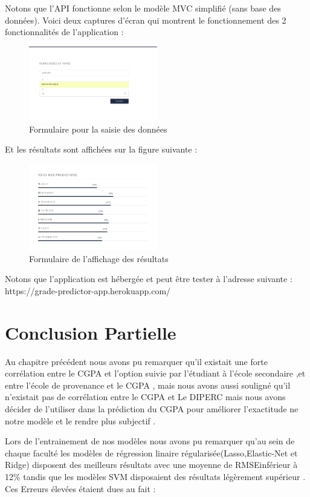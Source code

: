 Notons que l'API fonctionne selon le modèle \ac{MVC} simplifié (sans base des données).
Voici deux captures d'écran qui montrent le fonctionnement des 2 fonctionnalités de l'application :
\begin{figure}[H]
	\centering
	\includegraphics[width=0.5\textwidth]{fig/form.png}
	\caption{Formulaire pour la saisie des données }
	\label{fig:apiForm}
\end{figure}  
Et les résultats sont affichées sur la figure suivante :  
\begin{figure}[H]
	\centering
	\includegraphics[width=0.5\textwidth]{fig/results.png}
	\caption{Formulaire de l'affichage des résultats}
	\label{fig:displaydata}
\end{figure}  
Notons que l'application est hébergée et peut être tester à l'adresse suivante : https://grade-predictor-app.herokuapp.com/
  
\section{Conclusion Partielle }
Au chapitre précédent nous avons pu remarquer qu'il existait une forte corrélation entre le CGPA et l'option suivie par l'étudiant à l'école secondaire ,et entre l'école de provenance et le CGPA , mais nous avons aussi souligné qu'il n'existait pas de corrélation entre le CGPA et Le DIPERC mais nous avons décider de l'utiliser dans la prédiction du CGPA pour améliorer l'exactitude ne notre modèle et le rendre plus subjectif  .

Lors de l'entrainement de nos modèles nous avons pu remarquer qu'au sein de chaque faculté les modèles de régression linaire régularisée(Lasso,Elastic-Net et Ridge) disposent des meilleurs résultats avec une moyenne de \ac{RMSE}inférieur à 12\% tandis que les modèles SVM disposaient des résultats légèrement supérieur .
Ces Erreurs élevées étaient dues au fait :

